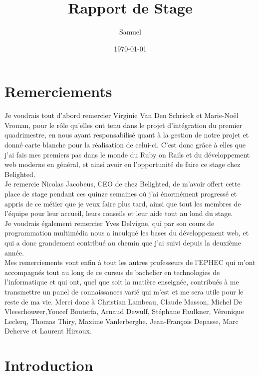 \documentclass{report}
\title{Rapport de Stage}
\author{Samuel \bsc{Monroe}}
\date{\today}
\begin{document}
\maketitle

\newpage
\thispagestyle{empty}
\mbox{}

\tableofcontents

\chapter*{Remerciements}

  Je voudrais tout d'abord remercier Virginie Van Den Schrieck et Marie-Noël Vroman, pour
  le rôle qu'elles ont tenu dans le projet d'intégration du premier quadrimestre,
  en nous ayant responsabilisé quant à la gestion de notre projet et donné carte
  blanche pour la réalisation de celui-ci.
  C'est donc grâce à elles que j'ai fais mes premiers pas dans le monde du Ruby on Rails
  et du développement web moderne en général, et ainsi avoir eu l'opportunité de faire ce stage chez Belighted.\\

  Je remercie Nicolas Jacobeus, CEO de chez Belighted, de m'avoir offert cette place de stage pendant ces quinze
  semaines où j'ai énormément progressé et appris de ce métier que je veux faire plus tard, ainsi que tout les membres
  de l'équipe pour leur accueil, leurs conseils et leur aide tout au lond du stage.\\

  Je voudrais également remercier Yves Delvigne, qui par son cours de programmation multimédia
  nous a inculqué les bases du développement web, et qui a donc grandement contribué
  au chemin que j'ai suivi depuis la deuxième année.\\

  Mes remerciements vont enfin à tout les autres professeurs de l'EPHEC qui m'ont accompagnés tout au long
  de ce cursus de bachelier en technologies de l'informatique et qui ont, quel que soit la matière
  enseignée, contribués à me transmettre un panel de connaissances varié qui m'est et me sera utile pour
  le reste de ma vie. Merci donc à Christian Lambeau, Claude Masson, Michel De Vleeschouwer,Youcef Bouterfa, Arnaud Dewulf,
  Stéphane Faulkner, Véronique Leclerq, Thomas Thiry, Maxime Vanlerberghe, Jean-François Depasse, Marc Deherve et Laurent Hirsoux.\\

\chapter{Introduction}
\end{document}
